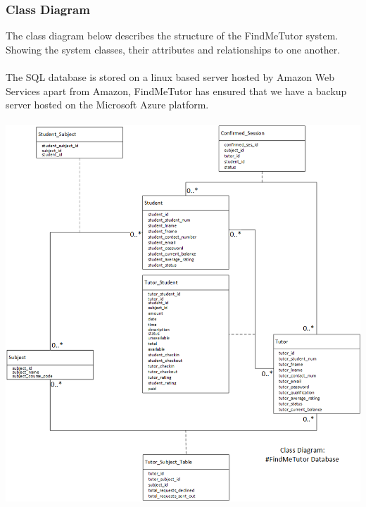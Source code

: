 \documentclass[12pt]{article}
\begin{document}
\subsubsection{Class Diagram}
The class diagram below describes the structure of the FindMeTutor system. Showing the system classes, their attributes and relationships to one another.\\\\
The SQL database is stored on a linux based server hosted by Amazon Web Services apart from Amazon, FindMeTutor has ensured that we have a backup server hosted on the Microsoft Azure platform. 
\\\\
\includegraphics[width=140mm]{./class_diagram/class_diagram_find-me_tutor.png}
\newpage
\end{document}
